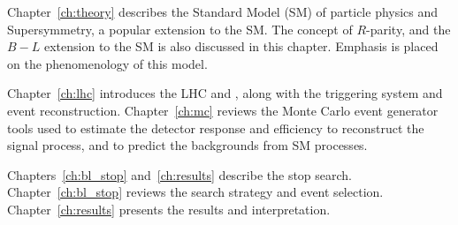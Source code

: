 Chapter~\ref{ch:theory} describes the Standard Model (SM) of
particle physics and Supersymmetry, a popular extension to the SM.
The concept of $R$-parity, and the $B-L$ extension to the SM is also discussed
in this chapter.
Emphasis is placed on the phenomenology of this model.

Chapter~\ref{ch:lhc} introduces the LHC and \atlas, along with the triggering
system and event reconstruction.
Chapter~\ref{ch:mc} reviews the Monte Carlo event generator tools used to
estimate the detector response and efficiency to reconstruct the signal
process, and to predict the backgrounds from SM processes.

Chapters~\ref{ch:bl_stop} and~\ref{ch:results} describe the stop search.
Chapter~\ref{ch:bl_stop} reviews the search strategy and event selection.
Chapter~\ref{ch:results} presents the results and interpretation.
